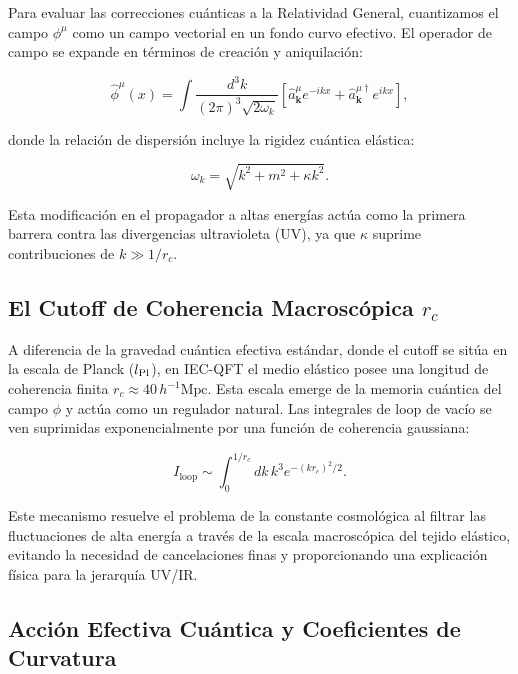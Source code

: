 \documentclass[11pt,a4paper]{article}
\begin{document}
Para evaluar las correcciones cuánticas a la Relatividad General, cuantizamos el campo \( \phi^\mu \) como un campo vectorial en un fondo curvo efectivo. El operador de campo se expande en términos de creación y aniquilación:

\begin{equation}
	\hat{\phi}^\mu(x) = \int \frac{d^3k}{(2\pi)^3 \sqrt{2\omega_k}} \left[ \hat{a}_{\mathbf{k}}^\mu e^{-i k x} + \hat{a}_{\mathbf{k}}^{\mu\dagger} e^{i k x} \right],
\end{equation}

donde la relación de dispersión incluye la rigidez cuántica elástica:

\begin{equation}
	\omega_k = \sqrt{k^2 + m^2 + \kappa k^2}.
\end{equation}

Esta modificación en el propagador a altas energías actúa como la primera barrera contra las divergencias ultravioleta (UV), ya que \( \kappa \) suprime contribuciones de \( k \gg 1/r_c \).

\subsection{El Cutoff de Coherencia Macroscópica \( r_c \)}

A diferencia de la gravedad cuántica efectiva estándar, donde el cutoff se sitúa en la escala de Planck (\( l_{\rm Pl} \)), en IEC-QFT el medio elástico posee una longitud de coherencia finita \( r_c \approx 40 \, h^{-1} \text{Mpc} \). Esta escala emerge de la memoria cuántica del campo \( \phi \) y actúa como un regulador natural. Las integrales de loop de vacío se ven suprimidas exponencialmente por una función de coherencia gaussiana:

\begin{equation}
	I_{\text{loop}} \sim \int_0^{1/r_c} dk \, k^3 e^{-(k r_c)^2 / 2}.
\end{equation}

Este mecanismo resuelve el problema de la constante cosmológica al filtrar las fluctuaciones de alta energía a través de la escala macroscópica del tejido elástico, evitando la necesidad de cancelaciones finas y proporcionando una explicación física para la jerarquía UV/IR.

\subsection{Acción Efectiva Cuántica y Coeficientes de Curvatura}
\end{document}
